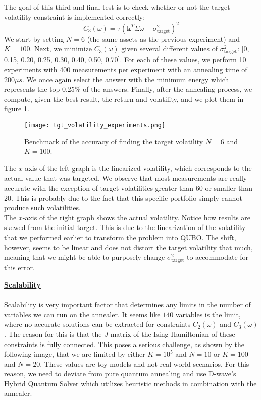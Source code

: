 \documentclass[12pt,a4paper]{report}
\begin{document}
\noindent
The goal of this third and final test is to check whether or not the target volatility constraint is implemented correctly:
\[ C_3(\omega) = \tau \left( \mathbf{k}^T \Sigma \omega - \sigma_{\text{target}}^2 \right)^2 \]
We start by setting \(N=6\) (the same assets as the previous experiment) and \(K=100\). Next, we minimize \(C_3(\omega)\) given several different values of \(\sigma_{\text{target}}^2\): [0, 0.15, 0.20, 0.25, 0.30, 0.40, 0.50, 0.70]. For each of these values, we perform 10 experiments with 400 measurements per experiment with an annealing time of \(200 \mu s\). We once again select the answer with the minimum energy which represents the top \(0.25\%\) of the answers. Finally, after the annealing process, we compute, given the best result, the return and volatility, and we plot them in figure \ref{fig:tgt_volatility}.

\begin{figure}[!h]
    \centering
    \texttt{[image: tgt\_volatility\_experiments.png]} 
    \caption{Benchmark of the accuracy of finding the target volatility \(N=6\) and \(K=100\).}
    \label{fig:tgt_volatility}
\end{figure}

\noindent
The \(x\)-axis of the left graph is the linearized volatility, which corresponds to the actual value that was targeted. We observe that most measurements are really accurate with the exception of target volatilities greater than \(60\) or smaller than \(20\). This is probably due to the fact that this specific portfolio simply cannot produce such volatilities. 
\\

\noindent
The \(x\)-axis of the right graph shows the actual volatility. Notice how results are skewed from the initial target. This is due to the linearization of the volatility that we performed earlier to transform the problem into QUBO. The shift, however, seems to be linear and does not distort the target volatility that much, meaning that we might be able to purposely change \(\sigma_{\text{target}}^2\) to accommodate for this error.

\newpage
\noindent
\textbf{\underline{Scalability}}
\\~\\
Scalability is very important factor that determines any limits in the number of variables we can run on the annealer. It seems like \(140\) variables is the limit, where no accurate solutions can be extracted for constraints \(C_2(\omega)\) and \(C_3(\omega)\). The reason for this is that the \(J\) matrix of the Ising Hamiltonian of these constraints is fully connected. This poses a serious challenge, as shown by the following image, that we are limited by either \(K=10^5\) and \(N=10\) or \(K=100\) and \(N=20\). These values are toy models and not real-world scenarios. For this reason, we need to deviate from pure quantum annealing and use D-wave's Hybrid Quantum Solver which utilizes heuristic methods in combination with the annealer.
\end{document}
